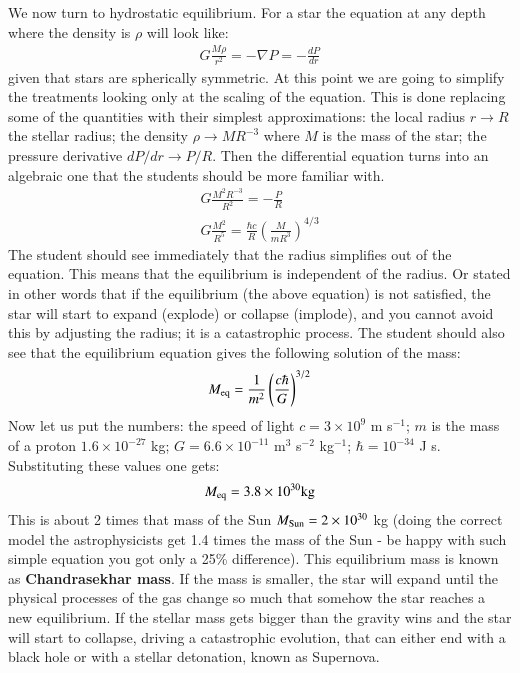 \documentclass[a4paper,12pt]{article}
\begin{document}
We now turn to hydrostatic equilibrium. For a star the equation at
any depth where the density is $\rho$ will look like:
\begin{align}
G\frac{M\rho}{r^2} = -\nabla P = -\frac{dP}{dr}
\end{align}
given that stars are spherically symmetric. At this point we are going
to simplify the treatments looking only at the scaling of the
equation. This is done replacing some of the quantities with their
simplest approximations: the local radius
$r\rightarrow R$ the stellar radius; the density $\rho \rightarrow M
R^{-3}$ where $M$ is the mass of the star; the pressure derivative
$dP/dr \rightarrow P/R$. Then the differential equation turns into an
algebraic one that the students should be more familiar with.
\begin{align}
G\frac{M^2 R^{-3}}{R^2} = -\frac{P}{R}\\
G\frac{M^2}{R^5}  =\frac{ \hbar c}{R} \left(\frac{M}{mR^3}\right)^{4/3}
\end{align}
The student should see immediately that the radius simplifies out of
the equation. This means that the equilibrium is independent of the
radius. Or stated in other words that if the equilibrium (the above
equation) is not satisfied, the star will start to expand (explode) or
collapse (implode), and you cannot avoid this by adjusting the radius;
it is a catastrophic process. The student should also see that the
equilibrium equation gives the following solution of the mass:
\begin{align}
M_{\rm eq} = \frac{1}{m^2}\left(\frac{c \hbar}{G}   \right)^{3/2}
\end{align}
Now let us put the numbers: the speed of light $c=3\times 10^9$ m
s$^{-1}$; $m$ is the mass of a proton $1.6 \times
10^{-27}$ kg; $G = 6.6 \times 10^{-11}$ m$^3$ s$^{-2}$ kg$^{-1}$;
$\hbar=10^{-34}$ J s. Substituting these values one gets:
\begin{align}
M_{\rm eq} = 3.8 \times 10^{30} {\rm kg}
\end{align}
This is about 2 times that mass of the Sun $M_{\rm Sun} = 2\times
10^{30}$ kg (doing the correct model the astrophysicists get 1.4 times
the mass of the Sun - be happy with such simple equation you got only
a 25\% difference). This equilibrium mass is known as {\bf Chandrasekhar mass}. If
the mass is smaller, the star will expand until the physical processes
of the gas change so much that somehow the star reaches a new
equilibrium. If the stellar mass gets bigger than the gravity wins and the star will
start to collapse, driving a catastrophic evolution, that can either
end with a black hole or with a stellar detonation, known as Supernova.

\vspace{5mm}
\end{document}
